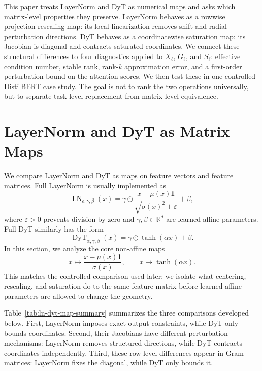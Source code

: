 \documentclass[11pt]{article}
\newcommand{\one}{\mathbf{1}}
\newcommand{\LN}{\operatorname{LN}}
\newcommand{\DyT}{\operatorname{DyT}}
\begin{document}
This paper treats LayerNorm and DyT as numerical maps and asks which matrix-level properties they preserve. LayerNorm behaves as a rowwise projection-rescaling map: its local linearization removes shift and radial perturbation directions. DyT behaves as a coordinatewise saturation map: its Jacobian is diagonal and contracts saturated coordinates. We connect these structural differences to four diagnostics applied to \(X_\ell\), \(G_\ell\), and \(S_\ell\): effective condition number, stable rank, rank-$k$ approximation error, and a first-order perturbation bound on the attention scores. We then test these in one controlled DistilBERT case study. The goal is not to rank the two operations universally, but to separate task-level replacement from matrix-level equivalence.

\section{LayerNorm and DyT as Matrix Maps}
\label{sec:maps}

We compare LayerNorm and DyT as maps on feature vectors and feature matrices. Full LayerNorm is usually implemented as
\[
    \LN_{\varepsilon,\gamma,\beta}(x)
    =
    \gamma\odot
    \frac{x-\mu(x)\one}{\sqrt{\sigma(x)^2+\varepsilon}}
    +
    \beta,
\]
where \(\varepsilon>0\) prevents division by zero and \(\gamma,\beta\in\mathbb R^d\) are learned affine parameters. Full DyT similarly has the form
\[
    \DyT_{\alpha,\gamma,\beta}(x)
    =
    \gamma\odot \tanh(\alpha x)+\beta.
\]
In this section, we analyze the core non-affine maps
\[
    x\mapsto \frac{x-\mu(x)\one}{\sigma(x)},
    \qquad
    x\mapsto \tanh(\alpha x).
\]
This matches the controlled comparison used later: we isolate what centering, rescaling, and saturation do to the same feature matrix before learned affine parameters are allowed to change the geometry.

Table~\ref{tab:ln-dyt-map-summary} summarizes the three comparisons developed below. First, LayerNorm imposes exact output constraints, while DyT only bounds coordinates. Second, their Jacobians have different perturbation mechanisms: LayerNorm removes structured directions, while DyT contracts coordinates independently. Third, these row-level differences appear in Gram matrices: LayerNorm fixes the diagonal, while DyT only bounds it.
\end{document}
